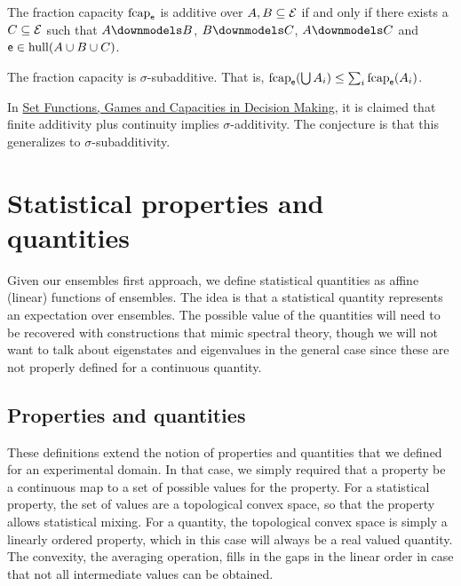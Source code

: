 \begin{conj}
	The fraction capacity $\mathrm{fcap}_{\mathsf{e}}$ is additive over $A, B \subseteq \mathcal{E}$ if and only if there exists a $C \subseteq \mathcal{E}$ such that $A \separate B$, $B \separate C$, $A \separate C$ and $\mathsf{e} \in \mathrm{hull}(A\cup B\cup C)$.
\end{conj}

\begin{conj}
	The fraction capacity is $\sigma$-subadditive. That is, $\mathrm{fcap}_{\mathsf{e}}(\bigcup A_i) \leq \sum_i \mathrm{fcap}_{\mathsf{e}}(A_i)$.
\end{conj}

\begin{remark}
	In \href{https://link.springer.com/book/10.1007/978-3-319-30690-2}{Set Functions, Games and Capacities in Decision Making}, it is claimed that finite additivity plus continuity implies $\sigma$-additivity. The conjecture is that this generalizes to $\sigma$-subadditivity.
\end{remark}

\section{Statistical properties and quantities}

Given our ensembles first approach, we define statistical quantities as affine (linear) functions of ensembles. The idea is that a statistical quantity represents an expectation over ensembles. The possible value of the quantities will need to be recovered with constructions that mimic spectral theory, though we will not want to talk about eigenstates and eigenvalues in the general case since these are not properly defined for a continuous quantity.

\subsection{Properties and quantities}

These definitions extend the notion of properties and quantities that we defined for an experimental domain. In that case, we simply required that a property be a continuous map to a set of possible values for the property. For a statistical property, the set of values are a topological convex space, so that the property allows statistical mixing. For a quantity, the topological convex space is simply a linearly ordered property, which in this case will always be a real valued quantity. The convexity, the averaging operation, fills in the gaps in the linear order in case that not all intermediate values can be obtained.

